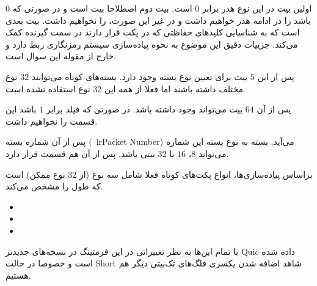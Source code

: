\documentclass[12pt]{article}
\begin{document}
\begin{enumerate}
\begin{latin}
\begin{center}
\begin{Verbatim}
			\end{Verbatim}
			
		\end{center}
	\end{latin}
	
	
\end{enumerate}

اولین بیت در این نوع هدر برابر $0$ است. بیت دوم اصطلاحا بیت  است و در صورتی که $0$ باشد  را در ادامه هدر خواهیم داشت و در غیر این صورت،  را نخواهیم داشت. بیت بعدی  است که به شناسایی کلید‌های حفاظتی که در پکت قرار دارند در سمت گیرنده کمک می‌کند. جزییات دقیق این موضوع به نحوه پیاده‌سازی سیستم رمزنگاری  ربط دارد و خارج از مقوله این سوال است.

پس از این $5$ بیت برای تعیین نوع بسته وجود دارد. بسته‌های کوتاه می‌توانند $32$ نوع مختلف داشته باشند اما فعلا از همه این $32$ نوع استفاده نشده است.

پس از آن $64$ بیت  می‌تواند وجود داشته باشد. در صورتی که فیلد  برابر $1$ باشد این قسمت را نخواهیم داشت.

پس از آن شماره بسته (\ lr{Packet Number}) می‌آید. بسته به نوع بسته این شماره می‌تواند $8$، $16$ یا $32$ بیتی باشد. پس از آن هم قسمت  قرار دارد.

براساس پیاده‌سازی‌ها، انواع پکت‌های کوتاه فعلا شامل سه نوع (از $32$ نوع ممکن) است که طول  را مشخص می‌کند.


\begin{latin}
	\begin{itemize}
		\item {}
		
		\item {}
		
		
		\item {}
		
		
	
	\end{itemize}
\end{latin}

با تمام این‌ها به نظر تغییراتی در این فرمتینگ در نسخه‌‌های جدید‌تر Quic داده شده است و خصوصا در حالت Short شاهد اضافه شدن یکسری فلگ‌های تک‌بیتی دیگر هم هستیم.
\end{document}
